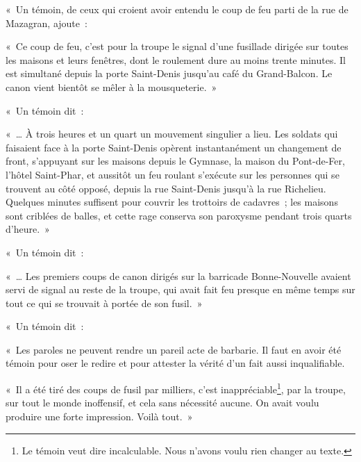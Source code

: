 \documentclass[french,twoside]{book} %
\newenvironment{quoteblock}%
  {\begin{quoting}}
  {\end{quoting}}
\newenvironment{quotebar}{%
    \def\FrameCommand{{\color{rubric!10!}\vrule width 0.5em} \hspace{0.9em}}%
    \def\OuterFrameSep{0pt} %
    \MakeFramed {\advance\hsize-\width \FrameRestore}
  }%
  {%
    \endMakeFramed
  }
\renewenvironment{quoteblock}%
  {%
    \savenotes
    \setstretch{0.9}
    \begin{quotebar}
    \smallskip
  }
  {%
    \smallskip
    \end{quotebar}
    \spewnotes
  }
\begin{document}
« Un témoin, de ceux qui croient avoir entendu le coup de feu parti de la rue de Mazagran, ajoute :\par

\begin{quoteblock}
 \noindent « Ce coup de feu, c’est pour la troupe le signal d’une fusillade dirigée sur toutes les maisons et leurs fenêtres, dont le roulement dure au moins trente minutes. Il est simultané depuis la porte Saint-Denis jusqu’au café du Grand-Balcon. Le canon vient bientôt se mêler à la mousqueterie. »
 \end{quoteblock}

« Un témoin dit :\par

\begin{quoteblock}
 \noindent « … À trois heures et un quart un mouvement singulier a lieu. Les soldats qui faisaient face à la porte Saint-Denis opèrent instantanément un changement de front, s’appuyant sur les maisons depuis le Gymnase, la maison du Pont-de-Fer, l’hôtel Saint-Phar, et aussitôt un feu roulant s’exécute sur les personnes qui se trouvent au côté opposé, depuis la rue Saint-Denis jusqu’à la rue Richelieu. Quelques minutes suffisent pour couvrir les trottoirs de cadavres ; les maisons sont criblées de balles, et cette rage conserva son paroxysme pendant trois quarts d’heure. »
 \end{quoteblock}

« Un témoin dit :\par

\begin{quoteblock}
 \noindent « … Les premiers coups de canon dirigés sur la barricade Bonne-Nouvelle avaient servi de signal au reste de la troupe, qui avait fait feu presque en même temps sur tout ce qui se trouvait à portée de son fusil. »
 \end{quoteblock}

« Un témoin dit :\par

\begin{quoteblock}
 \noindent « Les paroles ne peuvent rendre un pareil acte de barbarie. Il faut en avoir été témoin pour oser le redire et pour attester la vérité d’un fait aussi inqualifiable.\par
 « Il a été tiré des coups de fusil par milliers, c’est inappréciable\footnote{Le témoin veut dire incalculable. Nous n’avons voulu rien changer au texte.}, par la troupe, sur tout le monde inoffensif, et cela sans nécessité aucune. On avait voulu produire une forte impression. Voilà tout. »
 \end{quoteblock}
\end{document}
